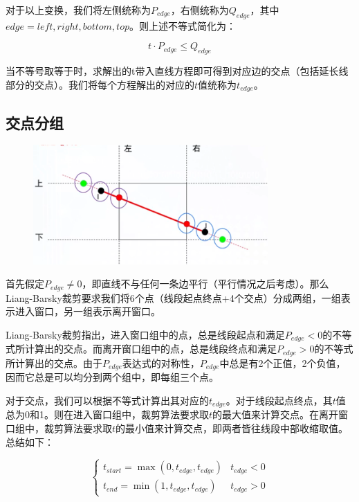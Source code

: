 对于以上变换，我们将左侧统称为$P_{edge}$，右侧统称为$Q_{edge}$，其中$edge=left,right,bottom,top$。则上述不等式简化为：

\begin{equation}
t \cdot P_{edge} \leq Q_{edge}
\end{equation}

当不等号取等于时，求解出的t带入直线方程即可得到对应边的交点（包括延长线部分的交点）。我们将每个方程解出的对应的$t$值统称为$t_{edge}$。

\subsection{交点分组}

\begin{figure}[H]
\centering
\includegraphics[width=0.8\textwidth,keepaspectratio]{imgs/lb-clip-intersection.png}
\end{figure}
 
首先假定$P_{edge} \neq 0$，即直线不与任何一条边平行（平行情况之后考虑）。那么Liang-Barsky裁剪要求我们将6个点（线段起点终点+4个交点）分成两组，一组表示进入窗口，另一组表示离开窗口。

Liang-Barsky裁剪指出，进入窗口组中的点，总是线段起点和满足$P_{edge}<0$的不等式所计算出的交点。而离开窗口组中的点，总是线段终点和满足$P_{edge}>0$的不等式所计算出的交点。由于$P_{edge}$表达式的对称性，$P_{edge}$中总是有2个正值，2个负值，因而它总是可以均分到两个组中，即每组三个点。

对于交点，我们可以根据不等式计算出其对应的$t_{edge}$。对于线段起点终点，其$t$值总为0和1。则在进入窗口组中，裁剪算法要求取$t$的最大值来计算交点。在离开窗口组中，裁剪算法要求取$t$的最小值来计算交点，即两者皆往线段中部收缩取值。总结如下：

\begin{equation}
\begin{cases}
t_{start} = \max ⁡(0,t_{edge},t_{edge}) & t_{edge}<0 \\
t_{end} = \min ⁡(1,t_{edge},t_{edge}) & t_{edge}>0
\end{cases}
\end{equation}

